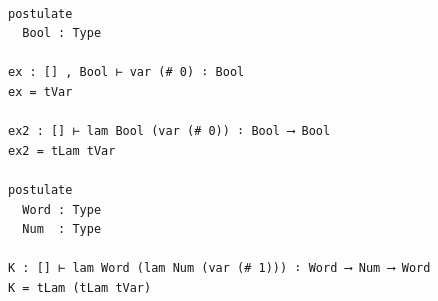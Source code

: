 \documentclass[10pt, xetex, hyperref={pdfpagelabels=false}]{beamer}
\begin{document}
\begin{frame}[fragile]
\begin{verbatim}

postulate
  Bool : Type

ex : [] , Bool ⊢ var (# 0) ∶ Bool
ex = tVar

ex2 : [] ⊢ lam Bool (var (# 0)) ∶ Bool ⟶ Bool
ex2 = tLam tVar

postulate
  Word : Type
  Num  : Type

K : [] ⊢ lam Word (lam Num (var (# 1))) ∶ Word ⟶ Num ⟶ Word
K = tLam (tLam tVar)
\end{verbatim}
\end{frame}

\end{document}

